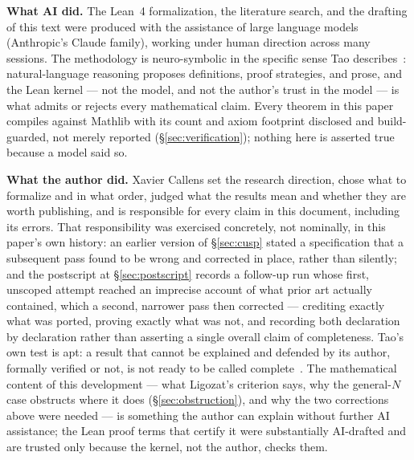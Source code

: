 \documentclass[11pt, a4paper]{article}
\newcommand{\lean}[1]{\ifmmode\text{\ttfamily\detokenize{#1}}\else{\ttfamily\detokenize{#1}}\fi}
\theoremstyle{remark}
\begin{document}
\textbf{What AI did.} The Lean~4 formalization, the literature search, and the drafting of this
text were produced with the assistance of large language models (Anthropic's Claude family),
working under human direction across many sessions. The methodology is neuro-symbolic in the
specific sense Tao describes~\cite{Tao2026AI}: natural-language reasoning proposes definitions,
proof strategies, and prose, and the Lean kernel --- not the model, and not the author's trust in
the model --- is what admits or rejects every mathematical claim. Every theorem in this paper
compiles against Mathlib with its \lean{sorry} count and axiom footprint disclosed and
build-guarded, not merely reported (\S\ref{sec:verification}); nothing here is asserted true
because a model said so.

\textbf{What the author did.} Xavier Callens set the research direction, chose what to formalize
and in what order, judged what the results mean and whether they are worth publishing, and is
responsible for every claim in this document, including its errors. That responsibility was
exercised concretely, not nominally, in this paper's own history: an earlier version of
\S\ref{sec:cusp} stated a specification that a subsequent pass found to be wrong and corrected in
place, rather than silently; and the postscript at \S\ref{sec:postscript} records a follow-up run
whose first, unscoped attempt reached an imprecise account of what prior art actually contained,
which a second, narrower pass then corrected --- crediting exactly what was ported, proving
exactly what was not, and recording both declaration by declaration rather than asserting a single
overall claim of completeness. Tao's own test is apt: a result that cannot be explained and
defended by its author, formally verified or not, is not ready to be called
complete~\cite{Tao2026AI}. The mathematical content of this development --- what Ligozat's
criterion says, why the general-$N$ case obstructs where it does (\S\ref{sec:obstruction}), and why
the two corrections above were needed --- is something the author can explain without further AI
assistance; the Lean proof terms that certify it were substantially AI-drafted and are trusted only
because the kernel, not the author, checks them.
\end{document}
